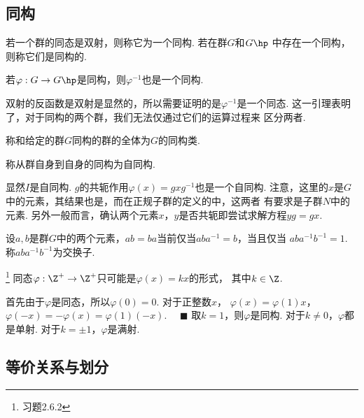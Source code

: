 \subsection{同构}

  \begin{defi}
    若一个群的同态是双射，则称它为一个同构. 若在群$G$和$G\hp$
    中存在一个同构，则称它们是同构的.
  \end{defi}

  \begin{lemma}
    若$\varphi:G\to G\hp$是同构，则$\varphi^{-1}$也是一个同构.
  \end{lemma}
  \proof
    双射的反函数是双射是显然的，所以需要证明的是$\varphi^{-1}$是一个同态.
  \remark
    这一引理表明了，对于同构的两个群，我们无法仅通过它们的运算过程来
    区分两者.

  \begin{defi}[同构类]
    称和给定的群$G$同构的群的全体为$G$的同构类.
  \end{defi}

  \begin{defi}
    称从群自身到自身的同构为自同构.
  \end{defi}
  \remark
    显然$I$是自同构. $g$的共轭作用$\varphi(x)=gxg^{-1}$也是一个自同构.
    注意，这里的$x$是$G$中的元素，其结果也是，而在正规子群的定义的中，这两者
    有要求是子群$N$中的元素.
    另外一般而言，确认两个元素$x$，$y$是否共轭即尝试求解方程$yg=gx$.

  \begin{lemma}[交换子]
    \label{lemma: 交换子}
    设$a,b$是群$G$中的两个元素，$ab=ba$当前仅当$aba^{-1}=b$，当且仅当
    $aba^{-1}b^{-1}=1$. 称$aba^{-1}b^{-1}$为交换子.
  \end{lemma}

  \begin{pos}
    \footnote{习题2.6.2}
    同态$\varphi:\Z^{+}\to\Z^+$只可能是$\varphi(x)=kx$的形式，
    其中$k\in\Z$.
  \end{pos}
  \proof
    首先由于$\varphi$是同态，所以$\varphi(0)=0$. 对于正整数$x$，
    $\varphi(x) = \varphi(1)x$，$\varphi(-x)=-\varphi(x)=
    \varphi(1)(-x)$. $\quad\blacksquare$
  \remark
    取$k=1$，则$\varphi$是同构. 对于$k\ne 0$，$\varphi$都是单射.
    对于$k=\pm 1$，$\varphi$是满射.

\subsection{等价关系与划分}

